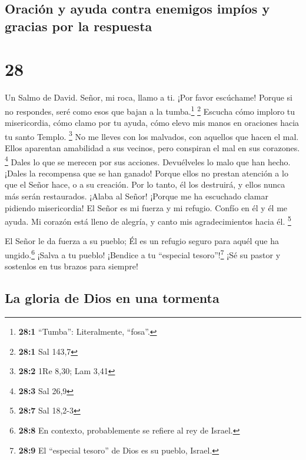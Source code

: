 \hypertarget{oraciuxf3n-y-ayuda-contra-enemigos-impuxedos-y-gracias-por-la-respuesta}{%
\subsection{Oración y ayuda contra enemigos impíos y gracias por la
respuesta}\label{oraciuxf3n-y-ayuda-contra-enemigos-impuxedos-y-gracias-por-la-respuesta}}

\hypertarget{section-27}{%
\section{28}\label{section-27}}

Un Salmo de David.  Señor, mi roca, llamo a ti. ¡Por favor
escúchame! Porque si no respondes, seré como esos que bajan a la
tumba.\footnote{\textbf{28:1} ``Tumba'': Literalmente, ``fosa''.}
\footnote{\textbf{28:1} Sal 143,7}  Escucha cómo imploro
tu misericordia, cómo clamo por tu ayuda, cómo elevo mis manos en
oraciones hacia tu santo Templo. \footnote{\textbf{28:2} 1Re 8,30; Lam
  3,41}  No me lleves con los malvados, con aquellos que
hacen el mal. Ellos aparentan amabilidad a sus vecinos, pero conspiran
el mal en sus corazones. \footnote{\textbf{28:3} Sal 26,9}
 Dales lo que se merecen por sus acciones. Devuélveles lo
malo que han hecho. ¡Dales la recompensa que se han ganado!
 Porque ellos no prestan atención a lo que el Señor hace,
o a su creación. Por lo tanto, él los destruirá, y ellos nunca más serán
restaurados.  ¡Alaba al Señor! ¡Porque me ha escuchado
clamar pidiendo misericordia!  El Señor es mi fuerza y mi
refugio. Confío en él y él me ayuda. Mi corazón está lleno de alegría, y
canto mis agradecimientos hacia él. \footnote{\textbf{28:7} Sal 18,2-3}

 El Señor le da fuerza a su pueblo; Él es un refugio
seguro para aquél que ha ungido.\footnote{\textbf{28:8} En contexto,
  probablemente se refiere al rey de Israel.}  ¡Salva a tu
pueblo! ¡Bendice a tu ``especial tesoro''!\footnote{\textbf{28:9} El
  ``especial tesoro'' de Dios es su pueblo, Israel.} ¡Sé su pastor y
sostenlos en tus brazos para siempre!

\hypertarget{la-gloria-de-dios-en-una-tormenta}{%
\subsection{La gloria de Dios en una
tormenta}\label{la-gloria-de-dios-en-una-tormenta}}

